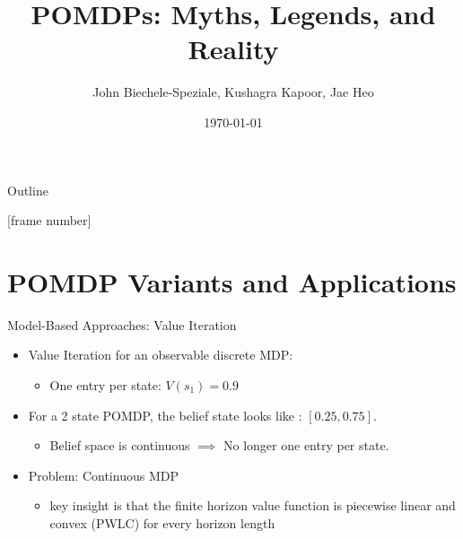 \documentclass[presentation, smaller]{beamer}
\author{John Biechele-Speziale, Kushagra Kapoor, Jae Heo}
\date{\today}
\title{POMDPs: Myths, Legends, and Reality}
\begin{document}
\maketitle
\begin{frame}{Outline}
\setcounter{tocdepth}{1}
\tableofcontents
\end{frame}

[frame number]

\section{POMDP Variants and Applications}

\begin{frame}{Model-Based Approaches: Value Iteration}
    \begin{itemize}
        \item Value Iteration for an observable discrete MDP:
        \begin{itemize}
            \item One entry per state: $V(s_1) = 0.9$
        \end{itemize}
        
        \item For a 2 state POMDP, the belief state looks like : $[0.25, 0.75]$. 
        \begin{itemize}
            \item Belief space is continuous $\implies$ No longer one entry per state.
        \end{itemize}
        \item Problem: Continuous MDP
        \begin{itemize}
            \item key insight is that the finite horizon value function is piecewise linear and convex (PWLC) for every horizon length
        \end{itemize}
        
    \end{itemize}
    
\end{frame}
\end{document}
